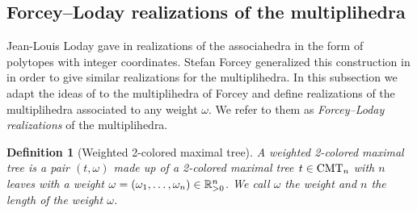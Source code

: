 \documentclass[twoside, 12pt]{amsart}
\newtheorem{definition}{Definition}[section]
\theoremstyle{remark}
\begin{document}

\subsection{Forcey--Loday realizations of the multiplihedra}
Jean-Louis Loday gave in \cite{Loday04a} realizations of the associahedra in the form of polytopes with integer coordinates. 
Stefan Forcey generalized this construction in \cite{Forcey08} in order to give similar realizations for the multiplihedra. 
In this subsection we adapt the ideas of \cite{MTTV19} to the multiplihedra of Forcey and define realizations of the multiplihedra associated to any weight $\omega$. We refer to them as \emph{Forcey--Loday realizations} of the multiplihedra.

\begin{definition}[Weighted 2-colored maximal tree]
A \emph{weighted 2-colored maximal tree} is a pair $(t, \omega)$ made up of a 2-colored maximal tree $t\in \mathrm{CMT}_{n}$ with $n$ leaves with a weight $\omega= (\omega_1, \ldots, \omega_n) \in \mathbb{R}_{>0}^n$. 
We call $\omega$ the \emph{weight} and $n$ the \emph{length} of the weight $\omega$.
\end{definition}
\end{document}
